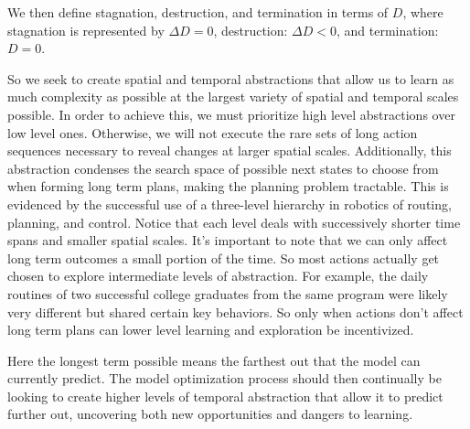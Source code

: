 \documentclass{article}
\begin{document}
We then define stagnation, destruction, and termination in terms of $D$, where stagnation is represented by $\Delta D = 0$, destruction: $\Delta D < 0$, and termination: $D = 0$.

So we seek to create spatial and temporal abstractions that allow us to learn as much complexity as possible at the largest variety of spatial and temporal scales possible. In order to achieve this, we must prioritize high level abstractions over low level ones. Otherwise, we will not execute the rare sets of long action sequences necessary to reveal changes at larger spatial scales. Additionally, this abstraction condenses the search space of possible next states \cite{BerliacHierachialRL2019} to choose from when forming long term plans, making the planning problem tractable. This is evidenced by the successful use of a three-level hierarchy in robotics \cite{gat1998three} of routing, planning, and control. Notice that each level deals with successively shorter time spans and smaller spatial scales. It's important to note that we can only affect long term outcomes a small portion of the time. So most actions actually get chosen to explore intermediate levels of abstraction. For example, the daily routines of two successful college graduates from the same program were likely very different but shared certain key behaviors. So only when actions don't affect long term plans can lower level learning and exploration be incentivized.

Here the longest term possible means the farthest out that the model can currently predict. The model optimization process should then continually \cite{stanley2005evolving} be looking to create higher levels of temporal abstraction that allow it to predict further out, uncovering both new opportunities and dangers to learning.
\end{document}

